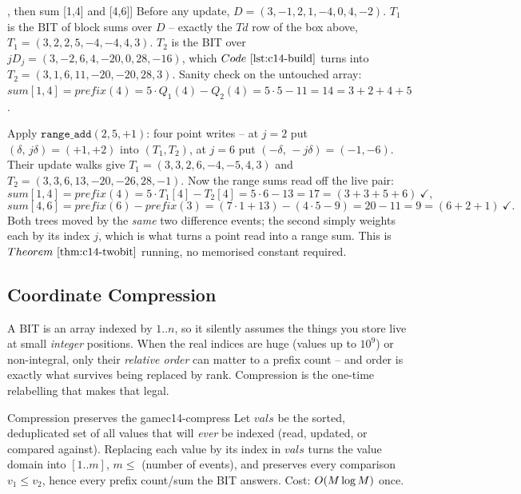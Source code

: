 \begin{tracebox}[Both BITs side by side: start a=(3,2,4,5,1,1,5,3), add +1 to [2,5], then sum [1,4] and [4,6]]
Before any update, \(D=(3,-1,2,1,-4,0,4,-2)\).  \(T_1\) is the BIT of block
sums over \(D\) -- exactly the \(Td\) row of the box above,
\(T_1=(3,2,2,5,-4,-4,4,3)\).  \(T_2\) is the BIT over \(jD_j=(3,-2,6,4,-20,0,28,-16)\),
which \(\coderef{c14-build}\) turns into \(T_2=(3,1,6,11,-20,-20,28,3)\).
Sanity check on the untouched array: \(\mathit{sum}[1,4]=\mathit{prefix}(4)=5{\cdot}Q_1(4)-Q_2(4)=5{\cdot}5-11=14=3{+}2{+}4{+}5\) \checkmark.

Apply \(\texttt{range\_add}(2,5,+1)\): four point writes -- at \(j=2\) put
\((\delta,\,j\delta)=(+1,+2)\) into \((T_1,T_2)\), at \(j=6\) put \((-\delta,\,-j\delta)=(-1,-6)\).
Their update walks give \(T_1=(3,3,2,6,-4,-5,4,3)\) and \(T_2=(3,3,6,13,-20,-26,28,-1)\).
Now the range sums read off the live pair:
\[
\mathit{sum}[1,4]=\mathit{prefix}(4)=5{\cdot}T_1[4]-T_2[4]=5{\cdot}6-13=17=(3{+}3{+}5{+}6)\ \checkmark ,
\]
\[
\mathit{sum}[4,6]=\mathit{prefix}(6)-\mathit{prefix}(3)=(7{\cdot}1+13)-(4{\cdot}5-9)=20-11=9=(6{+}2{+}1)\ \checkmark .
\]
Both trees moved by the \emph{same} two difference events; the second simply
weights each by its index \(j\), which is what turns a point read into a range
sum.  This is \(\thmref{c14-twobit}\) running, no memorised constant required.
\end{tracebox}

\subsection{Coordinate Compression}

A BIT is an array indexed by \(1..n\), so it silently assumes the things you
store live at small \emph{integer} positions.  When the real indices are huge
(values up to \(10^9\)) or non-integral, only their \emph{relative order} can
matter to a prefix count -- and order is exactly what survives being replaced
by rank.  Compression is the one-time relabelling that makes that legal.

\begin{proposition}{Compression preserves the game}{c14-compress}
Let \(\mathit{vals}\) be the sorted, deduplicated set of all values that will
\emph{ever} be indexed (read, updated, or compared against).  Replacing each
value by its index in \(\mathit{vals}\) turns the value domain into
\([1..m]\), \(m\le\) (number of events), and preserves every comparison
\(v_1\le v_2\), hence every prefix count/sum the BIT answers.  Cost:
\(O(M\log M)\) once.
\end{proposition}

